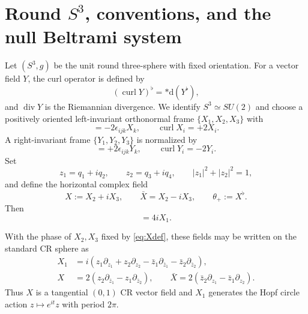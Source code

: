 \documentclass[aps,prd,reprint,nofootinbib,superscriptaddress]{revtex4-2}
\theoremstyle{definition}
\theoremstyle{remark}
\newcommand{\dd}{\mathrm{d}}
\newcommand{\Div}{\operatorname{div}}
\newcommand{\Curl}{\operatorname{curl}}
\begin{document}
\section{\texorpdfstring{Round $S^3$}{Round S3}, conventions, and the null Beltrami system}

Let $(S^3,g)$ be the unit round three-sphere with fixed orientation. For a vector field $Y$, the curl operator is defined by
\[
(\Curl Y)^\flat=*\dd(Y^\flat),
\]
and $\Div Y$ is the Riemannian divergence. We identify $S^3\simeq SU(2)$ and choose a positively oriented left-invariant orthonormal frame $\{X_1,X_2,X_3\}$ with
\begin{equation}
[X_i,X_j]=-2\epsilon_{ijk}X_k,
\qquad
\Curl X_i=+2X_i.
\label{eq:leftframe}
\end{equation}
A right-invariant frame $\{Y_1,Y_2,Y_3\}$ is normalized by
\begin{equation}
[Y_i,Y_j]=+2\epsilon_{ijk}Y_k,
\qquad
\Curl Y_i=-2Y_i.
\label{eq:rightframe}
\end{equation}
Set
\[
z_1=q_1+iq_2,\qquad z_2=q_3+iq_4,
\qquad |z_1|^2+|z_2|^2=1,
\]
and define the horizontal complex field
\begin{equation}
X:=X_2+iX_3,\qquad \bar X=X_2-iX_3,\qquad \theta_+:=X^\flat.
\label{eq:Xdef}
\end{equation}
Then
\begin{equation}
[X,\bar X]=4iX_1.
\label{eq:Xcomm}
\end{equation}

With the phase of $X_2,X_3$ fixed by \eqref{eq:Xdef}, these fields may be written on the standard CR sphere as
\begin{align}
X_1&=i\!\left(z_1\partial_{z_1}+z_2\partial_{z_2}
-\bar z_1\partial_{\bar z_1}-\bar z_2\partial_{\bar z_2}\right),
\label{eq:X1coords}\\
X&=2\!\left(z_2\partial_{\bar z_1}-z_1\partial_{\bar z_2}\right),
\qquad
\bar X=2\!\left(\bar z_2\partial_{z_1}-\bar z_1\partial_{z_2}\right).
\label{eq:Xcoords}
\end{align}
Thus $X$ is a tangential $(0,1)$ CR vector field and $X_1$ generates the Hopf circle action $z\mapsto e^{it}z$ with period $2\pi$.
\end{document}
